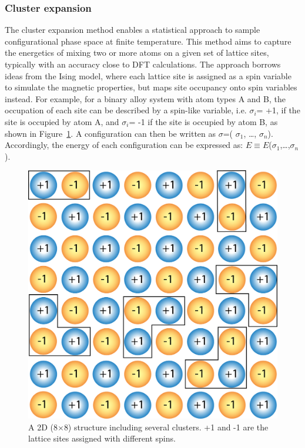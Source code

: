 \documentclass[../main.tex]{subfiles}
\begin{document}
\subsubsection{Cluster expansion}
\label{sec:cluster_expansion}
The cluster expansion method enables a statistical approach to sample configurational phase space at finite temperature.\cite{sanchez1984generalized,de1994cluster,blum2004mixed} This method aims to capture the energetics of mixing two or more atoms on a given set of lattice sites, typically with an accuracy close to DFT calculations. The approach borrows ideas from the Ising model\cite{gallavotti2013statistical}, where each lattice site is assigned as a spin variable to simulate the magnetic properties, but maps site occupancy onto spin variables instead.\cite{persson2010} For example, for a binary alloy system with atom types A and B, the occupation of each site can be described by a spin-like variable, i.e. $\sigma_i$= +1, if the site is occupied by atom A, and $\sigma_i$= -1 if the site is occupied by atom B, as shown in Figure~\ref{fig:cluster}. A configuration can then be written as $\sigma$=( $\sigma_1$, …, $\sigma_n$). Accordingly, the energy of each configuration can be expressed as: $E\equiv E$($\sigma_1$,…,$\sigma_n$).

\begin{figure}
    \centering
    \includegraphics[scale=0.5]{figures/clusters.png}
    \caption{A 2D (8$\times$8) structure including several clusters. +1 and -1 are the lattice sites assigned with different spins.}
    \label{fig:cluster}
\end{figure}
\end{document}
